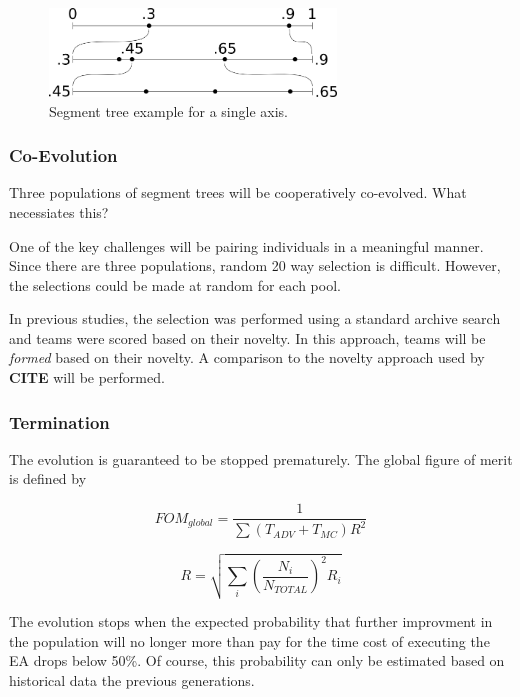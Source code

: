 \documentclass{article}
\begin{document}
\begin{figure}
    \centering
    \includegraphics[width=3.0in]{treeex}
    \caption{Segment tree example for a single axis.}
    \label{fig:segtree}
\end{figure}

\subsubsection{Co-Evolution}
Three populations of segment trees will be cooperatively co-evolved. What necessiates this? 

One of the key challenges will be pairing individuals in a meaningful manner. Since there are three populations, random 20 way selection is difficult. However, the selections could be made at random for each pool.

In previous studies, the selection was performed using a standard archive search and teams were scored based on their novelty. In this approach, teams will be \textit{formed} based on their novelty. A comparison to the novelty approach used by \textbf{CITE} will be performed.

\subsubsection{Termination}
The evolution is guaranteed to be stopped prematurely. The global figure of merit is defined by

\begin{equation}
FOM_{global} = \frac{1}{\sum \left( T_{ADV} + T_{MC} \right) R^2}
\end{equation}

\begin{equation}\label{eq:stddev_combine}
R = \sqrt{\sum_i \left( \frac{N_i}{N_{TOTAL}} \right)^2 R_i}
\end{equation}

The evolution stops when the expected probability that further improvment in the population will no longer more than pay for the time cost of executing the EA drops below 50\%. Of course, this probability can only be estimated based on historical data the previous generations.

\end{document}
